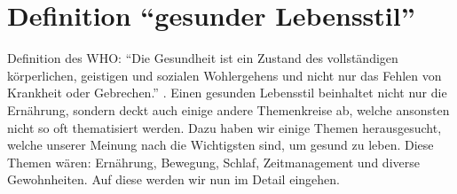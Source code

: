 \chapter{Definition “gesunder Lebensstil”}
\authortoc{\bastian}{\chapterident}
Definition des WHO: “Die Gesundheit ist ein Zustand des vollständigen körperlichen, geistigen und sozialen Wohlergehens und nicht nur das Fehlen von Krankheit oder Gebrechen.” \cite{gesundheit_definition}.
\newline
Einen gesunden Lebensstil beinhaltet nicht nur die Ernährung, sondern deckt auch einige andere Themenkreise ab, welche ansonsten nicht so oft thematisiert werden. Dazu haben wir einige Themen herausgesucht, welche unserer Meinung nach die Wichtigsten sind, um gesund zu leben. Diese Themen wären: Ernährung, Bewegung, Schlaf, Zeitmanagement und diverse Gewohnheiten. Auf diese werden wir nun im Detail eingehen.
